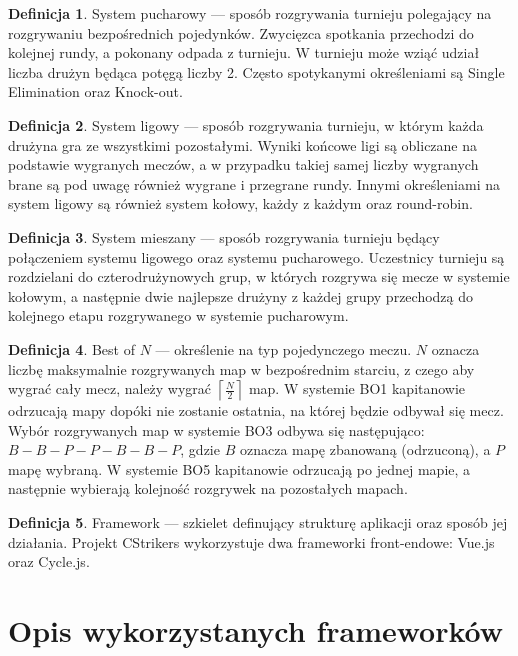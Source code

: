 \documentclass[shortabstract]{iithesis}
\theoremstyle{definition} \newtheorem{definition}{Definicja}[]
\theoremstyle{remark} \newtheorem{remark}[definition]{Observation}
\theoremstyle{plain} \newtheorem{theorem}[definition]{Theorem}
\theoremstyle{plain} \newtheorem{lemma}[definition]{Lemma}
\begin{document}
\begin{definition}
    System pucharowy --- sposób rozgrywania turnieju polegający na rozgrywaniu bezpośrednich pojedynków. Zwycięzca spotkania przechodzi do kolejnej rundy, a pokonany odpada z turnieju. W turnieju może wziąć udział liczba drużyn będąca potęgą liczby 2. Często spotykanymi określeniami są Single Elimination oraz Knock-out.
\end{definition}

\begin{definition}
    System ligowy --- sposób rozgrywania turnieju, w którym każda drużyna gra ze wszystkimi pozostałymi. Wyniki końcowe ligi są obliczane na podstawie wygranych meczów, a w przypadku takiej samej liczby wygranych brane są pod uwagę również wygrane i przegrane rundy. Innymi określeniami na system ligowy są również system kołowy, każdy z każdym oraz round-robin.
\end{definition}

\begin{definition}
    System mieszany --- sposób rozgrywania turnieju będący połączeniem systemu ligowego oraz systemu pucharowego. Uczestnicy turnieju są rozdzielani do czterodrużynowych grup, w których rozgrywa się mecze w systemie kołowym, a następnie dwie najlepsze drużyny z każdej grupy przechodzą do kolejnego etapu rozgrywanego w systemie pucharowym.
\end{definition}

\begin{definition}
    Best of $N$ --- określenie na typ pojedynczego meczu. $N$ oznacza liczbę maksymalnie rozgrywanych map w bezpośrednim starciu, z czego aby wygrać cały mecz, należy wygrać $\left\lceil \frac{N}{2} \right\rceil$ map. W systemie BO1 kapitanowie odrzucają mapy dopóki nie zostanie ostatnia, na której będzie odbywał się mecz. Wybór rozgrywanych map w systemie BO3 odbywa się następująco: $B - B - P - P - B - B - P$, gdzie $B$ oznacza mapę zbanowaną (odrzuconą), a $P$ mapę wybraną. W systemie BO5 kapitanowie odrzucają po jednej mapie, a następnie wybierają kolejność rozgrywek na pozostałych mapach.
\end{definition}

\begin{definition}
    Framework --- szkielet definujący strukturę aplikacji oraz sposób jej działania. Projekt CStrikers wykorzystuje dwa frameworki front-endowe: Vue.js oraz Cycle.js.
\end{definition}

\chapter{Opis wykorzystanych frameworków}
\end{document}
